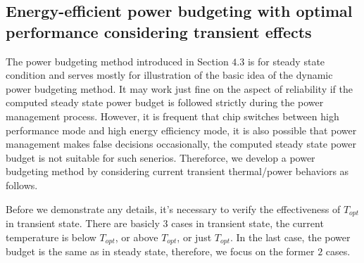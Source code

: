 
\subsection{Energy-efficient power budgeting with optimal performance considering transient effects}



The power budgeting method introduced in Section $4.3$ is for steady state condition and serves mostly for illustration of the basic idea of the dynamic power budgeting method. It may work just fine on the aspect of reliability if the computed steady state power budget is followed strictly during the power management process. However, it is frequent that chip switches between high performance mode and high energy efficiency mode, it is also possible that power management makes false decisions occasionally, the computed steady state power budget is not suitable for such senerios. Thereforce, we develop a power budgeting method by considering current transient thermal/power behaviors as follows.

Before we demonstrate any details, it's necessary to verify the effectiveness of $T_{opt}$ in transient state. There are basicly $3$ cases in transient state, the current temperature is below $T_{opt}$, or above $T_{opt}$, or just $T_{opt}$. In the last case, the power budget is the same as in steady state, therefore, we focus on the former $2$ cases.


